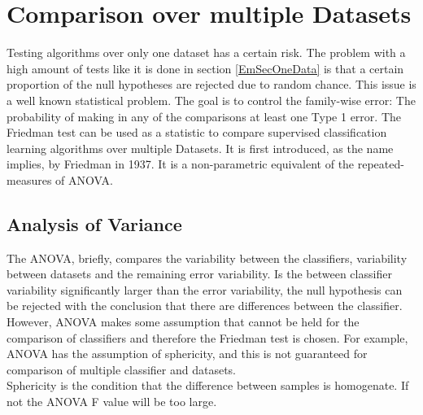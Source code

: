 \section{Comparison over multiple Datasets}\label{EmSecMulDa}
Testing algorithms over only one dataset has a certain risk. The problem with a high amount of tests like it is done in section \ref{EmSecOneData} is that a certain proportion of the null hypotheses are rejected due to random chance. This issue is a well known statistical problem. The goal is to control the family-wise error: The probability of making in any of the comparisons at least one Type 1 error.
The Friedman test can be used as a statistic to compare supervised classification learning algorithms over multiple Datasets.
It is first introduced, as the name implies, by Friedman in 1937. It is a non-parametric equivalent of the repeated-measures of \ac{ANOVA}.\cite[p. 9-10]{JanezDemsar.2006}\\ 
\subsection{Analysis of Variance}
The ANOVA, briefly, compares the variability between the classifiers, variability between datasets and the remaining error variability. 
Is the between classifier variability significantly larger than the error variability, the null hypothesis can be rejected with the conclusion that there are differences between the classifier.
However, \acs{ANOVA} makes some assumption that cannot be held for the comparison of classifiers and therefore the Friedman test is chosen.
For example, \acs{ANOVA} has the assumption of sphericity, and this is not guaranteed for comparison of multiple classifier and datasets.\cite[p. 10]{JanezDemsar.2006}\\
Sphericity is the condition that the difference between samples is homogenate. If not the \acs{ANOVA} F value will be too large.\cite[p. 152]{Hinton.2004}


